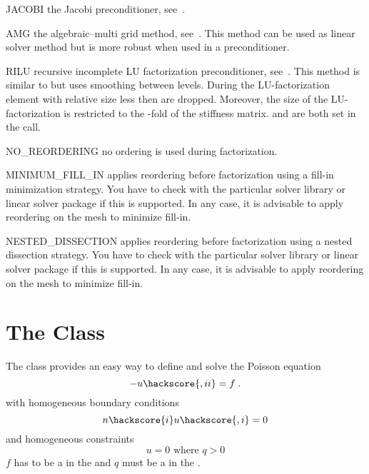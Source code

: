 \begin{memberdesc}[LinearPDE]{JACOBI}
the Jacobi preconditioner, see~.
\end{memberdesc}

\begin{memberdesc}[LinearPDE]{AMG}
the algebraic--multi grid method, see~. This method can be used as linear solver method but is more robust when used 
in a preconditioner.
\end{memberdesc}

\begin{memberdesc}[LinearPDE]{RILU}
recursive incomplete LU factorization preconditioner, see~. This method is similar to \ILUT but uses smoothing
between levels. During the  LU-factorization element with
relative size less then  are dropped. Moreover, the size of the LU-factorization is restricted to the
-fold of the stiffness matrix.  and  are both set in the 
 call. 
\end{memberdesc}

\begin{memberdesc}[LinearPDE]{NO_REORDERING}
no ordering is used during factorization.
\end{memberdesc}

\begin{memberdesc}[LinearPDE]{MINIMUM_FILL_IN}
applies reordering before factorization using a fill-in minimization strategy. You have to check with the particular solver library or
linear solver package if this is supported. In any case, it is advisable to apply reordering on the mesh to minimize fill-in.
\end{memberdesc}

\begin{memberdesc}[LinearPDE]{NESTED_DISSECTION}
applies reordering before factorization using a nested dissection strategy. You have to check with the particular solver library or
linear solver package if this is supported. In any case, it is advisable to apply reordering on the mesh to minimize fill-in.
\end{memberdesc}

\section{The \Poisson Class}
The \Poisson class provides an easy way to define and solve the Poisson
equation
\begin{equation}\label{POISSON.1}
-u\hackscore{,ii}=f\; .
\end{equation}
with homogeneous boundary conditions
\begin{equation}\label{POISSON.2}
n\hackscore{i}u\hackscore{,i}=0
\end{equation}
and homogeneous constraints
\begin{equation}\label{POISSON.3}
u=0 \mbox{ where } q>0
\end{equation}
$f$ has to be a \Scalar in the \Function and $q$ must be
a \Scalar in  the \SolutionFS. 

